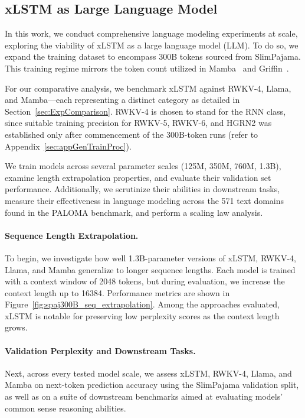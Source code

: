 \subsection{xLSTM as Large Language Model}
\label{sec:ExpLanguage}

In this work, we conduct comprehensive language modeling experiments at scale, exploring the viability of xLSTM as a large language model (LLM). To do so, we expand the training dataset to encompass 300B tokens sourced from SlimPajama. This training regime mirrors the token count utilized in Mamba~\citep{Gu:24arxiv} and Griffin~\citep{De:24arxiv}.

For our comparative analysis, we benchmark xLSTM against RWKV-4, Llama, and Mamba—each representing a distinct category as detailed in Section~\ref{sec:ExpComparison}. RWKV-4 is chosen to stand for the RNN class, since suitable training precision for RWKV-5, RWKV-6, and HGRN2 was established only after commencement of the 300B-token runs (refer to Appendix~\ref{sec:appGenTrainProc}).

We train models across several parameter scales (125M, 350M, 760M, 1.3B), examine length extrapolation properties, and evaluate their validation set performance. Additionally, we scrutinize their abilities in downstream tasks, measure their effectiveness in language modeling across the 571 text domains found in the PALOMA benchmark, and perform a scaling law analysis.

\paragraph{Sequence Length Extrapolation.}
\label{sec:spaj300B_ctx_extrapolation}
To begin, we investigate how well 1.3B-parameter versions of xLSTM, RWKV-4, Llama, and Mamba generalize to longer sequence lengths. Each model is trained with a context window of 2048 tokens, but during evaluation, we increase the context length up to 16384. Performance metrics are shown in Figure~\ref{fig:spaj300B_seq_extrapolation}. Among the approaches evaluated, xLSTM is notable for preserving low perplexity scores as the context length grows.

\paragraph{Validation Perplexity and Downstream Tasks.}
\label{sec:spaj_downstream_eval}
Next, across every tested model scale, we assess xLSTM, RWKV-4, Llama, and Mamba on next-token prediction accuracy using the SlimPajama validation split, as well as on a suite of downstream benchmarks aimed at evaluating models’ common sense reasoning abilities.

